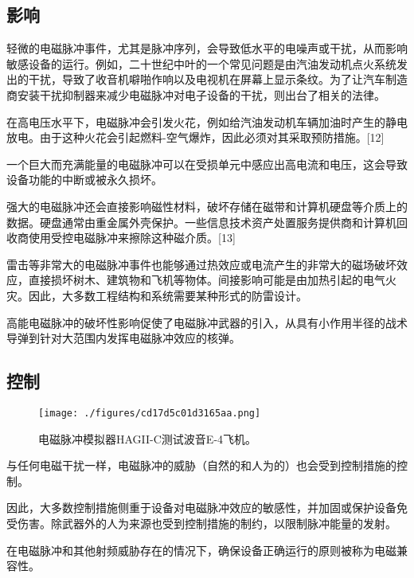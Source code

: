 \subsection{影响}
轻微的电磁脉冲事件，尤其是脉冲序列，会导致低水平的电噪声或干扰，从而影响敏感设备的运行。例如，二十世纪中叶的一个常见问题是由汽油发动机点火系统发出的干扰，导致了收音机噼啪作响以及电视机在屏幕上显示条纹。为了让汽车制造商安装干扰抑制器来减少电磁脉冲对电子设备的干扰，则出台了相关的法律。

在高电压水平下，电磁脉冲会引发火花，例如给汽油发动机车辆加油时产生的静电放电。由于这种火花会引起燃料-空气爆炸，因此必须对其采取预防措施。[12]

一个巨大而充满能量的电磁脉冲可以在受损单元中感应出高电流和电压，这会导致设备功能的中断或被永久损坏。

强大的电磁脉冲还会直接影响磁性材料，破坏存储在磁带和计算机硬盘等介质上的数据。硬盘通常由重金属外壳保护。一些信息技术资产处置服务提供商和计算机回收商使用受控电磁脉冲来擦除这种磁介质。[13]

雷击等非常大的电磁脉冲事件也能够通过热效应或电流产生的非常大的磁场破坏效应，直接损坏树木、建筑物和飞机等物体。间接影响可能是由加热引起的电气火灾。因此，大多数工程结构和系统需要某种形式的防雷设计。

高能电磁脉冲的破坏性影响促使了电磁脉冲武器的引入，从具有小作用半径的战术导弹到针对大范围内发挥电磁脉冲效应的核弹。

\subsection{控制}
\begin{figure}[ht]
\centering
\texttt{[image: ./figures/cd17d5c01d3165aa.png]}
\caption{电磁脉冲模拟器HAGII-C测试波音E-4飞机。} \label{fig_DCMC_2}
\end{figure}
与任何电磁干扰一样，电磁脉冲的威胁（自然的和人为的）也会受到控制措施的控制。

因此，大多数控制措施侧重于设备对电磁脉冲效应的敏感性，并加固或保护设备免受伤害。除武器外的人为来源也受到控制措施的制约，以限制脉冲能量的发射。

在电磁脉冲和其他射频威胁存在的情况下，确保设备正确运行的原则被称为电磁兼容性。
